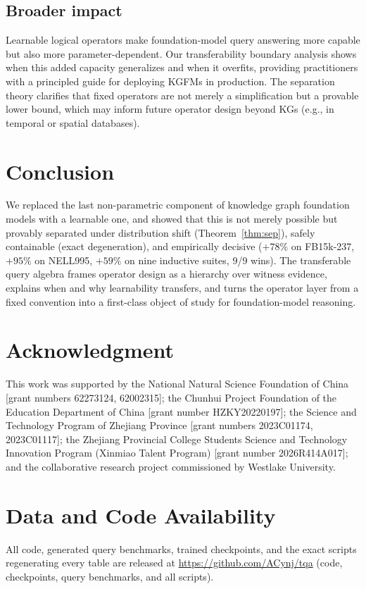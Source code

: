 \documentclass[journal]{IEEEtran}
\begin{document}
\subsection{Broader impact}
Learnable logical operators make foundation-model query answering more
capable but also more parameter-dependent. Our transferability boundary
analysis shows when this added capacity generalizes and when it
overfits, providing practitioners with a principled guide for deploying
KGFMs in production. The separation theory clarifies that fixed
operators are not merely a simplification but a provable lower bound,
which may inform future operator design beyond KGs (e.g., in temporal
or spatial databases).

\section{Conclusion}

We replaced the last non-parametric component of knowledge graph foundation
models with a learnable one, and showed that this is not merely possible
but provably separated under distribution shift
(Theorem~\ref{thm:sep}), safely containable (exact
degeneration), and empirically decisive ($+78\%$ on FB15k-237, $+95\%$ on NELL995,
$+59\%$ on nine inductive suites, 9/9 wins). The transferable query algebra frames operator design
as a hierarchy over witness evidence, explains when and why learnability
transfers, and turns the operator layer from a fixed convention into a
first-class object of study for foundation-model reasoning.

\section*{Acknowledgment}

This work was supported by the National Natural Science Foundation of China
[grant numbers 62273124, 62002315]; the Chunhui Project Foundation of the
Education Department of China [grant number HZKY20220197]; the Science and
Technology Program of Zhejiang Province [grant numbers 2023C01174,
2023C01117]; the Zhejiang Provincial College Students Science and
Technology Innovation Program (Xinmiao Talent Program) [grant number
2026R414A017]; and the collaborative research project commissioned by
Westlake University.

\section*{Data and Code Availability}
All code, generated query benchmarks, trained checkpoints, and the exact
scripts regenerating every table are released at
\url{https://github.com/ACynj/tqa} (code, checkpoints, query
benchmarks, and all scripts).
\end{document}

